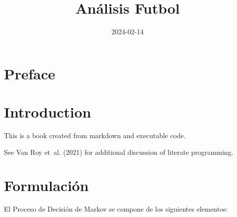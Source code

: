 \documentclass[
  us-letterpaper,
  DIV=11,
  numbers=noendperiod]{scrreprt}
\title{Análisis Futbol}
\author{}
\date{2024-02-14}
\renewcommand*\contentsname{Tabla de contenidos}
\newcommand\contentsname{Tabla de contenidos}
\begin{document}
\maketitle

\renewcommand*\contentsname{Tabla de contenidos}
{
\hypersetup{linkcolor=}
\setcounter{tocdepth}{2}
\tableofcontents
}


\chapter*{Preface}\label{preface}



\chapter{Introduction}\label{introduction}

This is a book created from markdown and executable code.

See Van Roy et~al. (2021) for additional discussion of literate
programming.


\chapter{Formulación}\label{formulaciuxf3n}

El Proceso de Decisión de Markov se compone de los siguientes elementos:
\end{document}
